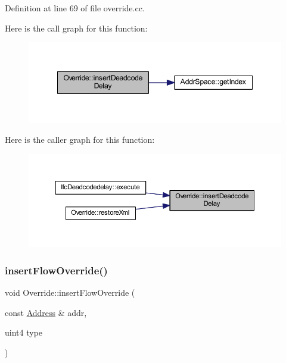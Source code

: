 Definition at line 69 of file override.\+cc.

Here is the call graph for this function\+:
\nopagebreak
\begin{figure}[H]
\begin{center}
\leavevmode
\includegraphics[width=348pt]{class_override_a2e55dd5f8157f3f7660c863eb7d036f9_cgraph}
\end{center}
\end{figure}
Here is the caller graph for this function\+:
\nopagebreak
\begin{figure}[H]
\begin{center}
\leavevmode
\includegraphics[width=350pt]{class_override_a2e55dd5f8157f3f7660c863eb7d036f9_icgraph}
\end{center}
\end{figure}
\mbox{\label{class_override_a840df7b308ba3fd78e1b16b23780f2bc}} 
\subsubsection{\texorpdfstring{insertFlowOverride()}{insertFlowOverride()}}
{\footnotesize\ttfamily void Override\+::insert\+Flow\+Override (\begin{DoxyParamCaption}\item[{const \mbox{\hyperlink{class_address}{Address}} \&}]{addr,  }\item[{uint4}]{type }\end{DoxyParamCaption})}




